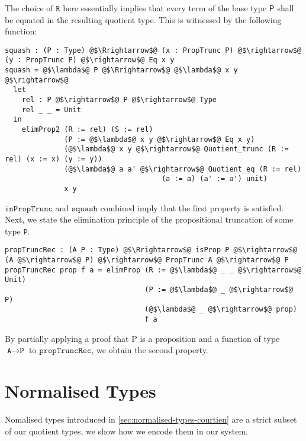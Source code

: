 \documentclass[12pt,twoside,maitrise]{dms}
\theoremstyle{definition}
\numberwithin{equation}{section}
\numberwithin{table}{chapter}
\numberwithin{figure}{chapter}
\newcommand\kw[1] {\textsf{#1}}
\newcommand\id[1] {\texttt{#1}}
\begin{document}
The choice of $\id{R}$ here essentially implies that every term of the base type $\kw{P}$ shall be equated in the resulting quotient type. This is witnessed by the following function:

\begin{verbatim}
squash : (P : Type) @$\Rrightarrow$@ (x : PropTrunc P) @$\rightarrow$@ (y : PropTrunc P) @$\rightarrow$@ Eq x y
squash = @$\lambda$@ P @$\Rrightarrow$@ @$\lambda$@ x y @$\rightarrow$@
  let
    rel : P @$\rightarrow$@ P @$\rightarrow$@ Type
    rel _ _ = Unit
  in
    elimProp2 (R := rel) (S := rel)
              (P := @$\lambda$@ x y @$\rightarrow$@ Eq x y)
              (@$\lambda$@ x y @$\rightarrow$@ Quotient_trunc (R := rel) (x := x) (y := y))
              (@$\lambda$@ a a' @$\rightarrow$@ Quotient_eq (R := rel)
                                     (a := a) (a' := a') unit)
              x y
\end{verbatim}

$\id{inPropTrunc}$ and $\id{squash}$ combined imply that the first property is satisfied. Next, we state the elimination principle of the propositional truncation of some type $\id{P}$.

\begin{verbatim}
propTruncRec : (A P : Type) @$\Rrightarrow$@ isProp P @$\rightarrow$@ (A @$\rightarrow$@ P) @$\rightarrow$@ PropTrunc A @$\rightarrow$@ P
propTruncRec prop f a = elimProp (R := @$\lambda$@ _ _ @$\rightarrow$@ Unit)
                                 (P := @$\lambda$@ _ @$\rightarrow$@ P)
                                 (@$\lambda$@ _ @$\rightarrow$@ prop)
                                 f a
\end{verbatim}

By partially applying a proof that P is a proposition and a function of type
$\id{A} \rightarrow \id{P}$ to $\id{propTruncRec}$, we obtain the second
property.

\section{Normalised Types}

Nomalised types introduced in \autoref{sec:normalised-types-courtieu} are a
strict subset of our quotient types, we show how we encode them in our system.
\end{document}
